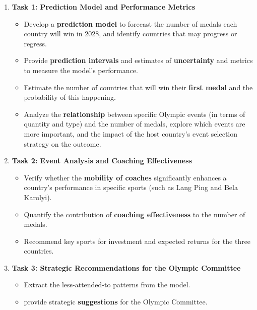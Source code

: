 \documentclass{mcmthesis}
\begin{document}
\begin{enumerate}[leftmargin=0.15in, labelsep=0.1in, itemsep=2.5pt, parsep=1pt]
	\item \textbf{Task 1: Prediction Model and Performance Metrics}
	\begin{itemize}[leftmargin=0.15in, labelsep=0.1in, itemsep=2.5pt, parsep=1pt]
		
		\item Develop a \textbf{prediction model} to forecast the number of medals each country will win in 2028, and identify countries that may progress or regress.
		
		\item Provide \textbf{prediction intervals} and estimates of \textbf{uncertainty} and metrics to measure the model's performance.
		
		\item Estimate the number of countries that will win their \textbf{first medal} and the probability of this happening.
		
		\item Analyze the \textbf{relationship} between specific Olympic events (in terms of quantity and type) and the number of medals, explore which events are more important, and the impact of the host country's event selection strategy on the outcome.
	\end{itemize}
	
	\item \textbf{Task 2: Event Analysis and Coaching Effectiveness}
	\begin{itemize}[leftmargin=0.15in, labelsep=0.1in, itemsep=2.5pt, parsep=1pt]
		
		
		\item Verify whether the \textbf{mobility of coaches} significantly enhances a country's performance in specific sports (such as Lang Ping and Bela Karolyi).
		
		\item Quantify the contribution of \textbf{coaching effectiveness} to the number of medals. 
		
		\item Recommend key sports for investment and expected returns for the three countries. 
	\end{itemize}
	
	\item \textbf{Task 3: Strategic Recommendations for the Olympic Committee}
	\begin{itemize}[leftmargin=0.15in, labelsep=0.1in, itemsep=2.5pt, parsep=1pt]
		\item Extract the less-attended-to patterns from the model. 
		\item provide strategic \textbf{suggestions} for the Olympic Committee. 
	\end{itemize}
	\end{enumerate}
%	
%	
%	
%	
%	
%	
%	
%	
%	
%	
\end{document}
